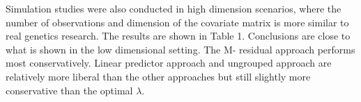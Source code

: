\documentclass{article}\usepackage[]{graphicx}\usepackage[]{color}
\begin{document}
   Simulation studies were also conducted in high dimension scenarios, where the number of observations and dimension of the covariate matrix is more similar to real genetics research. The results are shown in Table 1. Conclusions are close to what is shown in the low dimensional setting. The M- residual approach performs most conservatively. Linear predictor approach and ungrouped approach are relatively more liberal than the other approaches but still slightly more conservative than the optimal $\lambda$.
  
 
\end{document}

